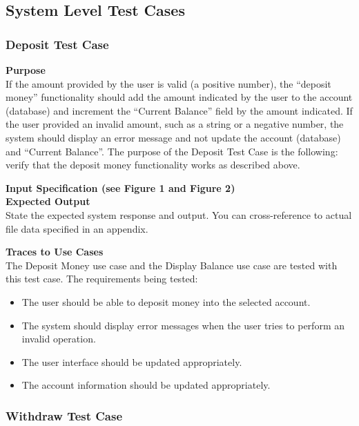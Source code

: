 \documentclass[12pt]{article}
\begin{document}
\subsection{System Level Test Cases}

\subsubsection{Deposit Test Case} \label{tc:1}

\noindent
{\bf Purpose}\\
If the amount provided by the user is valid (a positive number), the “deposit money” functionality should add the amount indicated by the user to the account (database) and increment the “Current Balance” field by the amount indicated.  If the user provided an invalid amount, such as a string or a negative number, the system should display an error message and not update the account (database) and “Current Balance”.  The purpose of the Deposit Test Case is the following: verify that the deposit money functionality works as described above.

\noindent
{\bf Input Specification (see Figure 1 and Figure 2)}\\







\noindent
{\bf Expected Output}\\
State the expected system response and output.
You can cross-reference to actual file data specified in an appendix.

\noindent
{\bf Traces to Use Cases}\\
The Deposit Money use case and the Display Balance use case are tested with this test case. The requirements being tested:
\begin{itemize}
  \item The user should be able to deposit money into the selected account.
  \item The system should display error messages when the user tries to perform an invalid operation.
  \item The user interface should be updated appropriately.
  \item The account information should be updated appropriately.
\end{itemize}

\subsubsection{Withdraw Test Case} \label{tc:2}
\end{document}
